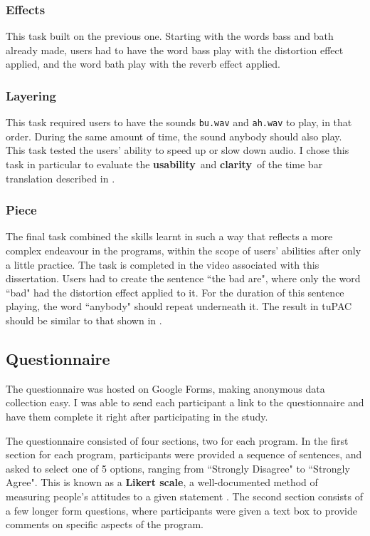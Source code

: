 \documentclass[12pt,a4paper,oneside,openright]{report}
\newcommand{\usability}{\textbf{usability}}
\newcommand{\clarity}{\textbf{clarity}}
\begin{document}
\subsubsection{Effects}
This task built on the previous one. Starting with the words bass and bath already made, users had to have the word bass play with the distortion effect applied, and the word bath play with the reverb effect applied.

\subsubsection{Layering}
This task required users to have the sounds \verb|bu.wav| and \verb|ah.wav| to play, in that order. During the same amount of time, the sound anybody should also play. This task tested the users' ability to speed up or slow down audio. I chose this task in particular to evaluate the \usability\ and \clarity\ of the time bar translation described in .

\subsubsection{Piece}
The final task combined the skills learnt in such a way that reflects a more complex endeavour in the programs, within the scope of users' abilities after only a little practice. The task is completed in the video associated with this dissertation. Users had to create the sentence ``the bad are", where only the word ``bad" had the distortion effect applied to it. For the duration of this sentence playing, the word ``anybody" should repeat underneath it. The result in tuPAC should be similar to that shown in .

\subsection{Questionnaire}
The questionnaire was hosted on Google Forms, making anonymous data collection easy. I was able to send each participant a link to the questionnaire and have them complete it right after participating in the study.

The questionnaire consisted of four sections, two for each program. In the first section for each program, participants were provided a sequence of sentences, and asked to select one of 5 options, ranging from ``Strongly Disagree" to ``Strongly Agree". This is known as a \textbf{Likert scale}, a well-documented method of measuring people's attitudes to a given statement \cite{Likert32}. The second section consists of a few longer form questions, where participants were given a text box to provide comments on specific aspects of the program.
\end{document}

